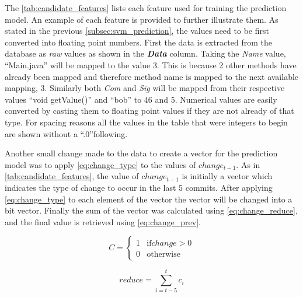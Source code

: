 
The \autoref{tab:candidate_features} lists each feature used for training the prediction model. An example of each feature is provided to further illustrate them. As stated in the previous \autoref{subsec:svm_prediction}, the values need to be first converted into floating point numbers. First the data is extracted from the database as \textit{raw} values as shown in the \textit{\textbf{Data}} column. Taking the \textit{Name} value, ``Main.java'' will be mapped to the value 3. This is because 2 other methods have already been mapped and therefore method name is mapped to the next available mapping, 3. Similarly both \textit{Com} and \textit{Sig} will be mapped from their respective values ``void getValue()'' and ``bob'' to 46 and 5. Numerical values are easily converted by casting them to floating point values if they are not already of that type. For spacing reasons all the values in the table that were integers to begin are shown without a ``.0''following.

Another small change made to the data to create a vector for the prediction model was to apply \autoref{eq:change_type} to the values of $change_{t-1}$. As in \autoref{tab:candidate_features}, the value of $change_{t-1}$ is initially a vector which indicates the type of change to occur in the last 5 commits. After applying \autoref{eq:change_type} to each element of the vector the vector will be changed into a bit vector. Finally the sum of the vector was calculated using \autoref{eq:change_reduce}, and the final value is retrieved using \autoref{eq:change_prev}.

\begin{equation} 
\label{eq:change_type}
C = \left\{\begin{matrix}
1 & \text{if} change > 0 \\
0 & \text{otherwise}
\end{matrix}\right.
\end{equation}

\begin{equation} 
\label{eq:change_reduce}
reduce = \sum_{i=t-5}^{t}{c_i}
\end{equation}

